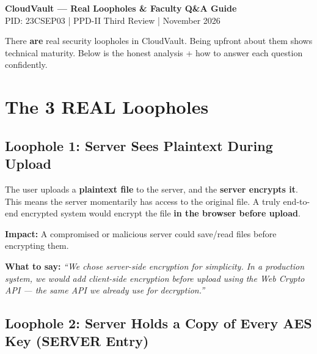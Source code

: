 \documentclass[11pt,a4paper]{article}
\begin{document}
\begin{center}
{\LARGE\bfseries CloudVault --- Real Loopholes \& Faculty Q\&A Guide}\\[0.5cm]
{\large PID: 23CSEP03 \hspace{0.5cm}|\hspace{0.5cm} PPD-II Third Review \hspace{0.5cm}|\hspace{0.5cm} November 2026}
\end{center}

\vspace{0.3cm}

\begin{importantbox}
There \textbf{are} real security loopholes in CloudVault. Being upfront about them shows technical maturity. Below is the honest analysis + how to answer each question confidently.
\end{importantbox}

\vspace{0.3cm}

\section{The 3 REAL Loopholes}

\subsection{Loophole 1: Server Sees Plaintext During Upload}

The user uploads a \textbf{plaintext file} to the server, and the \textbf{server encrypts it}. This means the server momentarily has access to the original file. A truly end-to-end encrypted system would encrypt the file \textbf{in the browser before upload}.

\textbf{Impact:} A compromised or malicious server could save/read files before encrypting them.

\textbf{What to say:} \textit{``We chose server-side encryption for simplicity. In a production system, we would add client-side encryption before upload using the Web Crypto API --- the same API we already use for decryption.''}

\subsection{Loophole 2: Server Holds a Copy of Every AES Key (SERVER Entry)}
\end{document}
